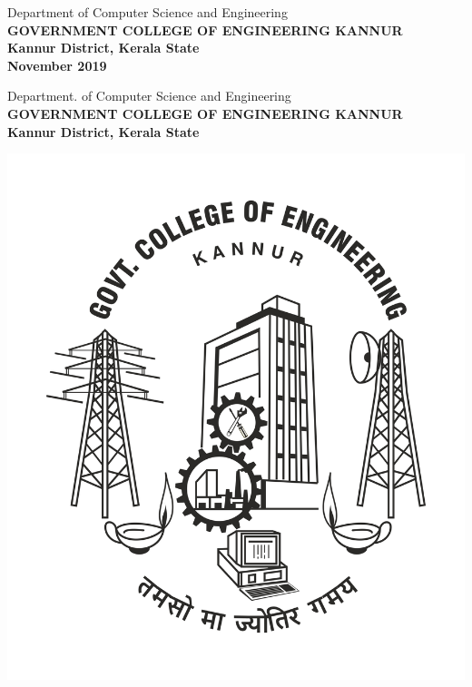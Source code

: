 \begin{titlepage}
\begin{center}
\vspace{1cm}
		  {{\sc Department of Computer Science and Engineering}}\\
		  {\bf \MakeUppercase{Government College  of Engineering Kannur}}\\ 
		  {\bf Kannur District, Kerala State}\\
	          {\bf November 2019}
	
\end{center}
\end{titlepage}

\cleardoublepage


\begin{center}
     { {\sc Department. of Computer Science and Engineering}}\\
     {\bf \MakeUppercase{Government College  of Engineering Kannur}}\\
     {\bf Kannur District, Kerala State}\\ \bigskip   
        
      \vspace*{25pt}
      \centerline{\includegraphics [keepaspectratio=true, scale=.2]{gcek.jpg}}
      \vspace*{2cm}
      \textbf{\large {}}
      \vspace*{1cm}     
\end{center}

